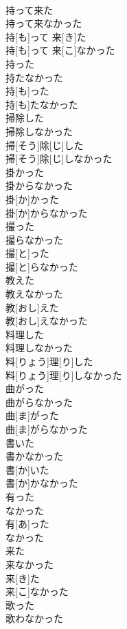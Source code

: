 \documentclass[8pt]{extreport}
\begin{document}
\begin{CJK}{UTF8}{min}
\\	持って来た 
\\	持って来なかった	
\\	持[も]って 来[き]た 
\\	持[も]って 来[こ]なかった
\\	持った 
\\	持たなかった	
\\	持[も]った 
\\	持[も]たなかった
\\	掃除した 
\\	掃除しなかった	
\\	掃[そう]除[じ]した 
\\	掃[そう]除[じ]しなかった
\\	掛かった 
\\	掛からなかった	
\\	掛[か]かった 
\\	掛[か]からなかった
\\	撮った 
\\	撮らなかった	
\\	撮[と]った 
\\	撮[と]らなかった
\\	教えた 
\\	教えなかった	
\\	教[おし]えた 
\\	教[おし]えなかった
\\	料理した 
\\	料理しなかった	
\\	料[りょう]理[り]した 
\\	料[りょう]理[り]しなかった
\\	曲がった 
\\	曲がらなかった	
\\	曲[ま]がった 
\\	曲[ま]がらなかった
\\	書いた 
\\	書かなかった	
\\	書[か]いた 
\\	書[か]かなかった
\\	有った 
\\	なかった	
\\	有[あ]った 
\\	なかった
\\	来た 
\\	来なかった	
\\	来[き]た 
\\	来[こ]なかった
\\	歌った 
\\	歌わなかった	

\end{CJK}
\end{document}
